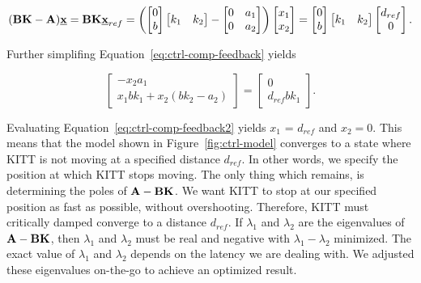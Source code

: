 \documentclass[11pt,titlepage]{report}
\begin{document}
\begin{equation} \label{eq:ctrl-comp-feedback}
	(\mathbf{B} \mathbf{K} - \mathbf{A}) \mathbf{\underline{x}} = \mathbf{B} \mathbf{K} \mathbf{\underline{x}}_{ref} = 
	\left( \begin{bmatrix}
		0 \\
		b
	\end{bmatrix} \begin{bmatrix}
		k_1 & k_2
	\end{bmatrix} - \begin{bmatrix}
		0 & a_1 \\
		0 & a_2
	\end{bmatrix} \right) \begin{bmatrix}
		x_1 \\
		x_2
	\end{bmatrix} = \begin{bmatrix}
		0 \\
		b
	\end{bmatrix} \begin{bmatrix}
		k_1 & k_2
	\end{bmatrix} \begin{bmatrix}
		d_{ref} \\
		0
	\end{bmatrix}.
\end{equation}

Further simplifing Equation~\ref{eq:ctrl-comp-feedback} yields

\begin{equation} \label{eq:ctrl-comp-feedback2}
	\begin{bmatrix}
		 -x_2 a_1 \\
		x_1 b k_1 + x_2 (b k_2 - a_2)
	\end{bmatrix} = \begin{bmatrix}
		0 \\
		d_{ref} b k_1
	\end{bmatrix}.
\end{equation}

Evaluating Equation~\ref{eq:ctrl-comp-feedback2} yields $x_1$ = $d_{ref}$ and $x_2=0$. This means that the model shown in Figure~\ref{fig:ctrl-model} converges to a state where KITT is not moving at a specified distance $d_{ref}$. In other words, we specify the position at which KITT stops moving. The only thing which remains, is determining the poles of $\mathbf{A} - \mathbf{B} \mathbf{K}$. We want KITT to stop at our specified position as fast as possible, without overshooting. Therefore, KITT must critically damped converge to a distance $d_{ref}$. If $\lambda_1$ and $\lambda_2$ are the eigenvalues of $\mathbf{A} - \mathbf{B} \mathbf{K}$, then $\lambda_1$ and $\lambda_2$ must be real and negative with $\lambda_1 - \lambda_2$ minimized. The exact value of $\lambda_1$ and $\lambda_2$ depends on the latency we are dealing with. We adjusted these eigenvalues on-the-go to achieve an optimized result.
\end{document}
